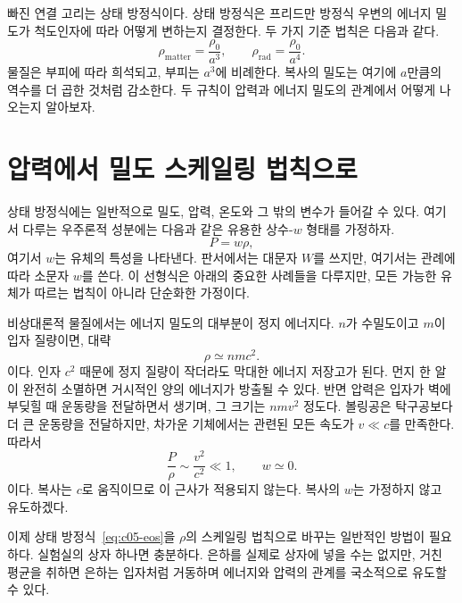 빠진 연결 고리는 상태 방정식이다. 상태 방정식은 프리드만 방정식 우변의 에너지 밀도가 척도인자에 따라 어떻게 변하는지 결정한다. 두 가지 기준 법칙은 다음과 같다.
\begin{equation}
\rho_{\text{matter}}=\frac{\rho_0}{a^3},
\qquad
\rho_{\text{rad}}=\frac{\rho_0}{a^4}.
\label{eq:c05-benchmark-densities}
\end{equation}
물질은 부피에 따라 희석되고, 부피는 \(a^3\)에 비례한다. 복사의 밀도는 여기에 \(a\)만큼의 역수를 더 곱한 것처럼 감소한다. 두 규칙이 압력과 에너지 밀도의 관계에서 어떻게 나오는지 알아보자.

\section{압력에서 밀도 스케일링 법칙으로}

상태 방정식에는 일반적으로 밀도, 압력, 온도와 그 밖의 변수가 들어갈 수 있다. 여기서 다루는 우주론적 성분에는 다음과 같은 유용한 상수-\(w\) 형태를 가정하자.
\begin{equation}
P=w\rho,
\label{eq:c05-eos}
\end{equation}
여기서 \(w\)는 유체의 특성을 나타낸다. 판서에서는 대문자 \(W\)를 쓰지만, 여기서는 관례에 따라 소문자 \(w\)를 쓴다. 이 선형식은 아래의 중요한 사례들을 다루지만, 모든 가능한 유체가 따르는 법칙이 아니라 단순화한 가정이다.

비상대론적 물질에서는 에너지 밀도의 대부분이 정지 에너지다. \(n\)가 수밀도이고 \(m\)이 입자 질량이면, 대략
\begin{equation}
\rho\simeq nmc^2.
\end{equation}
이다. 인자 \(c^2\) 때문에 정지 질량이 작더라도 막대한 에너지 저장고가 된다. 먼지 한 알이 완전히 소멸하면 거시적인 양의 에너지가 방출될 수 있다. 반면 압력은 입자가 벽에 부딪힐 때 운동량을 전달하면서 생기며, 그 크기는 \(nmv^2\) 정도다. 볼링공은 탁구공보다 더 큰 운동량을 전달하지만, 차가운 기체에서는 관련된 모든 속도가 \(v\ll c\)를 만족한다. 따라서
\begin{equation}
\frac{P}{\rho}\sim\frac{v^2}{c^2}\ll1,
\qquad
w\simeq0.
\label{eq:c05-dust-eos}
\end{equation}
이다. 복사는 \(c\)로 움직이므로 이 근사가 적용되지 않는다. 복사의 \(w\)는 가정하지 않고 유도하겠다.

이제 상태 방정식~\eqref{eq:c05-eos}을 \(\rho\)의 스케일링 법칙으로 바꾸는 일반적인 방법이 필요하다. 실험실의 상자 하나면 충분하다. 은하를 실제로 상자에 넣을 수는 없지만, 거친 평균을 취하면 은하는 입자처럼 거동하며 에너지와 압력의 관계를 국소적으로 유도할 수 있다.

